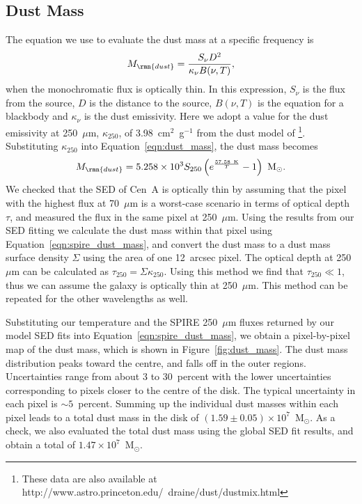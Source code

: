 \documentclass[useAMS,usenatbib,usegraphicx]{mn2e}
\begin{document}
\subsection{Dust Mass}\label{subsec:dust}
The equation we use to evaluate the dust mass at a specific frequency is
\begin{equation}\label{eqn:dust_mass}
 M_{\rmn{dust}} = \frac{S_{\nu}D^{2}}{\kappa_{\nu} B(\nu,T)},
\end{equation}
when the monochromatic flux is optically thin.  In this expression, $S_{\nu}$ is the flux from the source, $D$ is the distance to the source, $B(\nu,T)$ is the equation for a blackbody and $\kappa_{\nu}$ is the dust emissivity.  Here we adopt a value for the dust emissivity at 250~$\mu$m, $\kappa_{250}$, of 3.98~cm$^{2}$~g$^{-1}$ from the dust model of \citet{2003ARA&A..41..241D}\footnote{These data are also available at \newline http://www.astro.princeton.edu/~draine/dust/dustmix.html}.  Substituting $\kappa_{250}$ into Equation~\ref{eqn:dust_mass}, the dust mass becomes
\begin{equation}\label{eqn:spire_dust_mass}
 M_{\rmn{dust}} = 5.258 \times 10^{3}S_{250}\left(e^{\frac{57.58~\mathrm{K}}{T}}-1\right) ~\mathrm{M}_{\odot}.
\end{equation}
We checked that the SED of Cen~A is optically thin by assuming that the pixel with the highest flux at 70~$\mu$m is a worst-case scenario in terms of optical depth $\tau$, and measured the flux in the same pixel at 250~$\mu$m.  Using the results from our SED fitting we calculate the dust mass within that pixel using Equation~\ref{eqn:spire_dust_mass}, and convert the dust mass to a dust mass surface density $\Sigma$ using the area of one 12~arcsec pixel. The optical depth at 250~$\mu$m can be calculated as $\tau_{250} = \Sigma \kappa_{250}$.  Using this method we find that $\tau_{250} \ll 1$, thus we can assume the galaxy is optically thin at 250~$\mu$m.  This method can be repeated for the other wavelengths as well.

Substituting our temperature and the SPIRE 250~$\mu$m fluxes returned by our model SED fits into Equation~\ref{eqn:spire_dust_mass}, we obtain a  pixel-by-pixel map of the dust mass, which is shown in Figure~\ref{fig:dust_mass}.  The dust mass distribution peaks toward the centre, and falls off in the outer regions.  Uncertainties range from about 3 to 30~percent with the lower uncertainties corresponding to pixels closer to the centre of the disk.  The typical uncertainty in each pixel is $\sim 5$~percent.  Summing up the individual dust masses within each pixel leads to a total dust mass in the disk of $(1.59 \pm 0.05) \times 10^{7}$~M$_{\odot}$.  As a check, we also evaluated the total dust mass using the global SED fit results, and obtain a total of $1.47 \times 10^{7}$~M$_{\odot}$.
\end{document}

